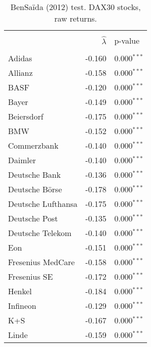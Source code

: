\documentclass[12pt]{article}
\begin{document}
\begin{table} [H]\scriptsize
    \caption{ BenSa\"{i}da (2012) test. DAX30 stocks, raw returns.}
    \begin{tabular*}{\textwidth}{@{\extracolsep{\fill}}lrl}
        \hline &  &  \\ 
        
                 & $\hat{\lambda}$ &  p-value \\
        \hline &  &  \\ 

        Adidas                      & -0.160 &  0.000$^{***}$\\ 
        Allianz                      & -0.158 &  0.000$^{***}$ \\ 
        BASF                       & -0.120 &  0.000$^{***}$\\ 
        Bayer                       & -0.149 &  0.000$^{***}$\\ 
        Beiersdorf                 & -0.175 &  0.000$^{***}$\\ 
        BMW                        & -0.152 &  0.000$^{***}$\\ 
        Commerzbank                & -0.140 & 0.000$^{***}$\\ 
        Daimler                    & -0.140 &  0.000$^{***}$\\ 
        Deutsche Bank               &-0.136  & 0.000$^{***}$ \\ 
        Deutsche B\"orse           & -0.178 & 0.000$^{***}$\\ 
        Deutsche Lufthansa         & -0.175 &  0.000$^{***}$\\ 
        Deutsche Post              & -0.135 &  0.000$^{***}$\\ 
        Deutsche Telekom           & -0.140 &  0.000$^{***}$\\ 
        Eon                         & -0.151 & 0.000$^{***}$ \\ 
        Fresenius MedCare          & -0.158 & 0.000$^{***}$ \\ 
        Fresenius SE               & -0.172 & 0.000$^{***}$\\ 
        Henkel                      & -0.184 &0.000$^{***}$\\ 
        Infineon                    & -0.129 & 0.000$^{***}$\\ 
        K+S                       & -0.167 &  0.000$^{***}$\\ 
        Linde                     & -0.159 & 0.000$^{***}$\\ 

\end{tabular*}
\end{table}
\end{document}
